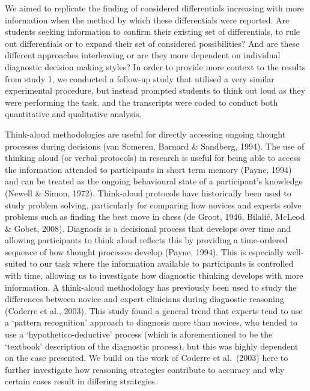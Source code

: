 \documentclass[a4paper, nobind]{templates/ociamthesis}
\begin{document}
\adjustmtc
{}

We aimed to replicate the finding of considered differentials increasing with more information when the method by which these differentials were reported. Are students seeking information to confirm their existing set of differentials, to rule out differentials or to expand their set of considered possibilities? And are these different approaches interleaving or are they more dependent on individual diagnostic decision making styles? In order to provide more context to the results from study 1, we conducted a follow-up study that utilised a very similar experimental procedure, but instead prompted students to think out loud as they were performing the task. and the transcripts were coded to conduct both quantitative and qualitative analysis.

Think-aloud methodologies are useful for directly accessing ongoing thought processes during decisions (van Someren, Barnard \& Sandberg, 1994). The use of thinking aloud (or verbal protocols) in research is useful for being able to access the information attended to participants in short term memory (Payne, 1994) and can be treated as the ongoing behavioural state of a participant's knowledge (Newell \& Simon, 1972). Think-aloud protocols have historically been used to study problem solving, particularly for comparing how novices and experts solve problems such as finding the best move in chess (de Groot, 1946, Bilalić, McLeod \& Gobet, 2008). Diagnosis is a decisional process that develops over time and allowing participants to think aloud reflects this by providing a time-ordered sequence of how thought processes develop (Payne, 1994). This is especially well-suited to our task where the information available to participants is controlled with time, allowing us to investigate how diagnostic thinking develops with more information. A think-aloud methodology has previously been used to study the differences between novice and expert clinicians during diagnostic reasoning (Coderre et al., 2003). This study found a general trend that experts tend to use a `pattern recognition' approach to diagnosis more than novices, who tended to use a `hypothetico-deductive' process (which is aforementioned to be the `textbook' description of the diagnostic process), but this was highly dependent on the case presented. We build on the work of Coderre et al.~(2003) here to further investigate how reasoning strategies contribute to accuracy and why certain cases result in differing strategies.
\end{document}
